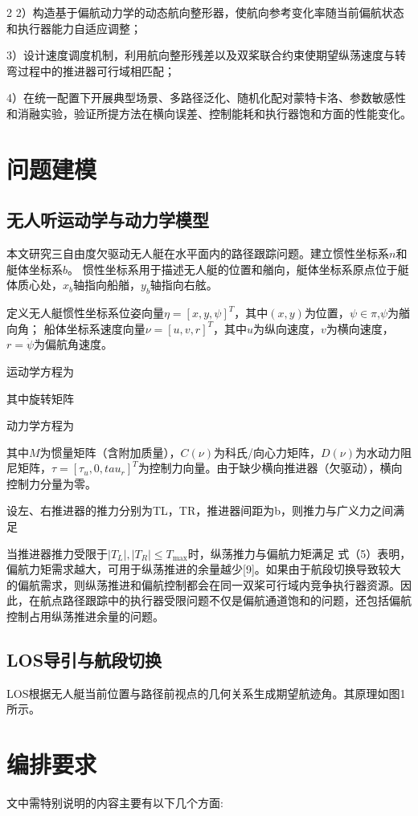 \documentclass[authordraft]{ctacn}%
\begin{document}
\begin{multicols}{2}
2）构造基于偏航动力学的动态航向整形器，使航向参考变化率随当前偏航状态和执行器能力自适应调整；

3）设计速度调度机制，利用航向整形残差以及双桨联合约束使期望纵荡速度与转弯过程中的推进器可行域相匹配；

4）在统一配置下开展典型场景、多路径泛化、随机化配对蒙特卡洛、参数敏感性和消融实验，验证所提方法在横向误差、控制能耗和执行器饱和方面的性能变化。


\section{问题建模}
\subsection{无人听运动学与动力学模型}
本文研究三自由度欠驱动无人艇在水平面内的路径跟踪问题。建立惯性坐标系${n}$和艇体坐标系${b}$。
惯性坐标系用于描述无人艇的位置和艏向，艇体坐标系原点位于艇体质心处，$x_b$轴指向船艏，$y_b$轴指向右舷。

定义无人艇惯性坐标系位姿向量$\eta=[x,y,\psi]^T$，其中$(x,y)$为位置，$\psi \in \pi$,$\psi$为艏向角；
船体坐标系速度向量$\nu = [u, v, r]^T$，其中$u$为纵向速度，$v$为横向速度，$r = \dot{\psi}$为偏航角速度。

运动学方程为

其中旋转矩阵

动力学方程为

其中$M$为惯量矩阵（含附加质量），$C(\nu)$为科氏/向心力矩阵，$D(\nu)$为水动力阻尼矩阵，$\tau=[\tau_u,0,tau_r]^T$为控制力向量。由于缺少横向推进器（欠驱动），横向控制力分量为零。

设左、右推进器的推力分别为TL，TR，推进器间距为b，则推力与广义力之间满足

当推进器推力受限于$|T_L|,|T_R|\leq T_{\max}$时，纵荡推力与偏航力矩满足
式（5）表明，偏航力矩需求越大，可用于纵荡推进的余量越少[9]。如果由于航段切换导致较大的偏航需求，则纵荡推进和偏航控制都会在同一双桨可行域内竞争执行器资源。因此，在航点路径跟踪中的执行器受限问题不仅是偏航通道饱和的问题，还包括偏航控制占用纵荡推进余量的问题。

\subsection{LOS导引与航段切换}
LOS根据无人艇当前位置与路径前视点的几何关系生成期望航迹角。其原理如图1所示。

\section{编排要求}
文中需特别说明的内容主要有以下几个方面:


\end{multicols}
\end{document}
